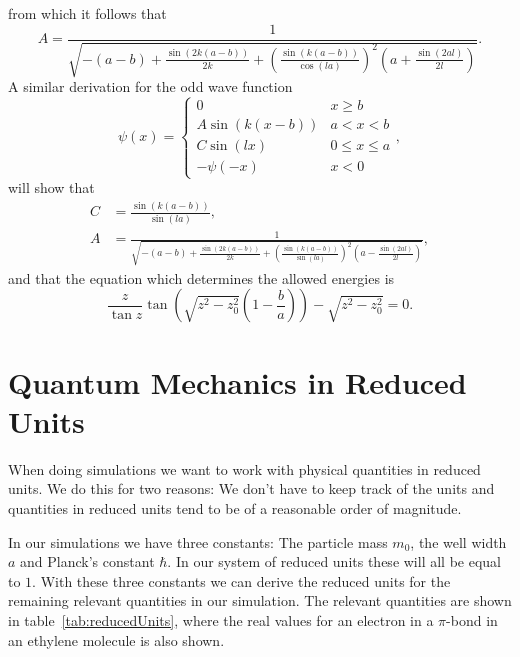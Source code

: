 \documentclass[12pt,a4paper]{article}
\begin{document}
from which it follows that
\begin{equation}
A = \frac{1}{\sqrt{-(a - b) + \frac{\sin \left( 2 k (a - b) \right)}{2 k}  + \left( \frac{\sin \left(k (a - b) \right)}{\cos (la)} \right)^2 \left(a + \frac{\sin(2 a l)}{2 l} \right)}}.
\end{equation}
A similar derivation for the odd wave function
\begin{equation}
\psi(x) = \begin{cases} 0 & x \geq b \\
                        A \sin \left(k (x - b) \right) & a < x < b \\
                        C \sin (l x) & 0 \leq x \leq a \\
                        -\psi(-x) & x < 0
\end{cases},
\end{equation}
will show that
\begin{align}
C &= \frac{\sin \left(k (a - b) \right)}{\sin (la)}, \\
A &= \frac{1}{\sqrt{-(a - b) + \frac{\sin \left( 2 k (a - b) \right)}{2 k}  + \left( \frac{\sin \left(k (a - b) \right)}{\sin (la)} \right)^2 \left(a - \frac{\sin(2 a l)}{2 l} \right)}},
\end{align}
and that the equation which determines the allowed energies is
\begin{equation}
\frac{z}{\tan z} \tan \left( \sqrt{z^2 - z_0^2} \left(1 - \frac{b}{a} \right) \right) - \sqrt{z^2 - z_0^2} = 0. \label{eq:posOddEnergies}
\end{equation}
\section{Quantum Mechanics in Reduced Units}
When doing simulations we want to work with physical quantities in reduced units. We do this for two reasons: We don't have to keep track of the units and quantities in reduced units tend to be of a reasonable order of magnitude.

In our simulations we have three constants: The particle mass $m_0$, the well width $a$ and Planck's constant $\hbar$. In our system of reduced units these will all be equal to $1$. With these three constants we can derive the reduced units for the remaining relevant quantities in our simulation. The relevant quantities are shown in table~\ref{tab:reducedUnits}, where the real values for an electron in a $\pi$-bond in an ethylene molecule is also shown.
\end{document}
